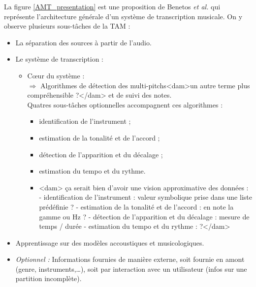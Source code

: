 La figure \ref{AMT_presentation} est une proposition de Benetos \textit{et al.}
\cite{future_directions}  qui représente l’architecture générale d’un
système de transcription musicale. On y observe plusieurs sous-tâches de
la TAM :
\begin{itemize}
	\item La séparation des sources à partir de l’audio.
	\item Le système de transcription :
	\begin{itemize}
		\item Cœur du système :\\
		$\Rightarrow$ Algorithmes de détection des multi-pitchs<dam>un autre terme plus compréhensible ?</dam> et de suivi des \tab notes.\\
		Quatres sous-tâches optionnelles accompagnent ces algorithmes :
		\begin{itemize}
			\item identification de l’instrument ;
			\item estimation de la tonalité et de l’accord ;
			\item détection de l’apparition et du décalage ;
			\item estimation du tempo et du rythme.
            \item <dam> ça serait bien d'avoir une vision approximative des données :
- identification de l’instrument : valeur symbolique prise dans une liste prédéfinie ?
- estimation de la tonalité et de l’accord : en note la gamme ou Hz ?
- détection de l’apparition et du décalage : mesure de temps / durée
- estimation du tempo et du rythme : ?</dam>
		\end{itemize}
	\end{itemize}
	\item Apprentissage sur des modèles accoustiques et musicologiques.
	\item \textit{Optionnel :} Informations fournies de manière externe, soit
        fournie en amont (genre, instruments,…), soit par interaction avec un
        utilisateur (infos sur une partition incomplète).
\end{itemize}
